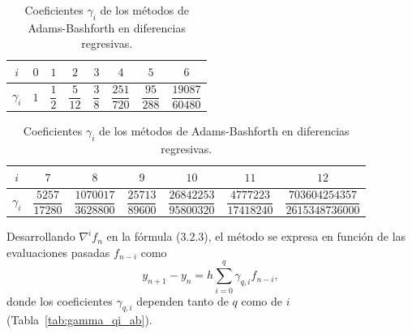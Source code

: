 \begin{table}[htbp]
    \centering
    \caption{Coeficientes $\gamma_i$ de los métodos de Adams-Bashforth en diferencias regresivas.}
    \label{tab:gamma_ab}
    \renewcommand{\arraystretch}{1.45}
    \small
    \begin{tabular}{cccccccc}
        \toprule
        $i$ & $0$ & $1$ & $2$ & $3$ & $4$ & $5$ & $6$ \\
        \midrule
        $\gamma_i$ & $1$ & $\dfrac{1}{2}$ & $\dfrac{5}{12}$ & $\dfrac{3}{8}$ & $\dfrac{251}{720}$ & $\dfrac{95}{288}$ & $\dfrac{19087}{60480}$ \\
        \bottomrule
    \end{tabular}

    \vspace{0.35cm}

    \begin{tabular}{ccccccc}
        \toprule
        $i$ & $7$ & $8$ & $9$ & $10$ & $11$ & $12$ \\
        \midrule
        $\gamma_i$ & $\dfrac{5257}{17280}$ & $\dfrac{1070017}{3628800}$ & $\dfrac{25713}{89600}$ & $\dfrac{26842253}{95800320}$ & $\dfrac{4777223}{17418240}$ & $\dfrac{703604254357}{2615348736000}$ \\
        \bottomrule
    \end{tabular}
\end{table}

Desarrollando $\nabla^i f_n$ en la fórmula (3.2.3), el método se expresa en función de las evaluaciones pasadas $f_{n-i}$ como
\begin{equation*}
    y_{n+1} - y_n = h \sum_{i=0}^{q} \gamma_{q,i} f_{n-i},
    \tag{3.2.6}
\end{equation*}
donde los coeficientes $\gamma_{q,i}$ dependen tanto de $q$ como de $i$ (Tabla~\ref{tab:gamma_qi_ab}).

